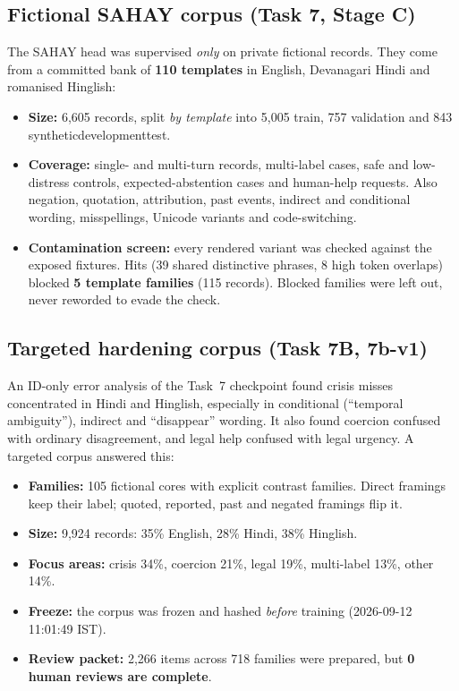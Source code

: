 \documentclass[11pt,a4paper]{article}
\newcommand{\codeus}{\textunderscore\allowbreak}
\DeclareRobustCommand{\code}[1]{{\ttfamily\let\_\codeus #1}}
\begin{document}
\subsection{Fictional SAHAY corpus (Task 7, Stage C)}
The SAHAY head was supervised \emph{only} on private fictional records. They come from a committed
bank of \textbf{110 templates} in English, Devanagari Hindi and romanised Hinglish:
\begin{itemize}
  \item \textbf{Size:} 6{,}605 records, split \emph{by template} into 5{,}005 train, 757 validation
        and 843 \code{synthetic\_development\_test}.
  \item \textbf{Coverage:} single- and multi-turn records, multi-label cases, safe and low-distress
        controls, expected-abstention cases and human-help requests. Also negation, quotation,
        attribution, past events, indirect and conditional wording, misspellings, Unicode variants
        and code-switching.
  \item \textbf{Contamination screen:} every rendered variant was checked against the exposed
        fixtures. Hits (39 shared distinctive phrases, 8 high token overlaps) blocked \textbf{5
        template families} (115 records). Blocked families were left out, never reworded to evade
        the check.
\end{itemize}

\subsection{Targeted hardening corpus (Task 7B, \code{7b-v1})}
An ID-only error analysis of the Task~7 checkpoint found crisis misses concentrated in Hindi and
Hinglish, especially in conditional (``temporal ambiguity''), indirect and ``disappear'' wording.
It also found coercion confused with ordinary disagreement, and legal help confused with legal
urgency. A targeted corpus answered this:
\begin{itemize}
  \item \textbf{Families:} 105 fictional cores with explicit contrast families. Direct framings
        keep their label; quoted, reported, past and negated framings flip it.
  \item \textbf{Size:} 9{,}924 records: 35\% English, 28\% Hindi, 38\% Hinglish.
  \item \textbf{Focus areas:} crisis 34\%, coercion 21\%, legal 19\%, multi-label 13\%, other 14\%.
  \item \textbf{Freeze:} the corpus was frozen and hashed \emph{before} training
        (2026-09-12 11:01:49 IST).
  \item \textbf{Review packet:} 2{,}266 items across 718 families were prepared, but
        \textbf{0 human reviews are complete}.
\end{itemize}
\end{document}
